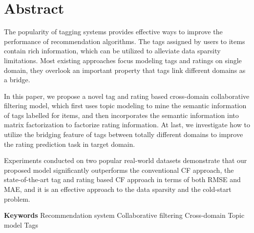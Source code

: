 \chapter{Abstract}

The popularity of tagging systems provides effective ways to improve the performance of recommendation algorithms. The tags assigned by users to items contain rich information, which can be utilized to alleviate data sparsity limitations. Most existing approaches focus modeling tags and ratings on single domain, they overlook an important property that tags link different domains as a bridge. 

In this paper, we propose a novel tag and rating based cross-domain collaborative filtering model, which first uses topic modeling to mine the semantic information of tags labelled for items, and then incorporates the semantic information into matrix factorization to factorize rating information. At last, we investigate how to utilize the bridging feature of tags between totally different domains to improve the rating prediction task in target domain.

Experiments conducted on two popular real-world datasets demonstrate that our proposed model significantly outperforms the conventional CF approach, the state-of-the-art tag and rating based CF approach in terms of both RMSE and MAE, and it is an effective approach to the data sparsity and the cold-start problem.

{
    \vspace{1em}
    \setlength{\parindent}{0em}
    \textbf{Keywords} \; Recommendation system \; Collaborative filtering \; Cross-domain \; Topic model \; Tags \par
}
